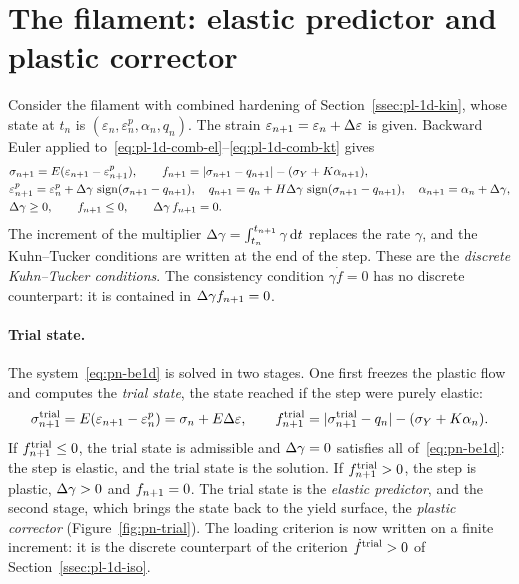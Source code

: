 \section{The filament: elastic predictor and plastic corrector}\label{sec:pn-1d}
%
Consider the filament with combined hardening of Section~\ref{ssec:pl-1d-kin},
whose state at $t_n$ is $(\varepsilon_n,\varepsilon^p_n,\alpha_n,q_n)$. The
strain $\varepsilon_{n+1}=\varepsilon_n+\Delta\varepsilon$ is given. Backward
Euler applied to~\eqref{eq:pl-1d-comb-el}--\eqref{eq:pl-1d-comb-kt} gives
\begin{equation}\label{eq:pn-be1d}
\begin{aligned}
  &\sigma_{n+1}=E(\varepsilon_{n+1}-\varepsilon^p_{n+1}),\qquad
  f_{n+1}=|\sigma_{n+1}-q_{n+1}|-(\sigma_{Y}+K\alpha_{n+1}),\\
  &\varepsilon^p_{n+1}=\varepsilon^p_n+\Delta\gamma\,\operatorname{sign}(\sigma_{n+1}-q_{n+1}),\quad
  q_{n+1}=q_n+H\Delta\gamma\,\operatorname{sign}(\sigma_{n+1}-q_{n+1}),\quad
  \alpha_{n+1}=\alpha_n+\Delta\gamma,\\
  &\Delta\gamma\ge0,\qquad f_{n+1}\le0,\qquad \Delta\gamma\,f_{n+1}=0 .
\end{aligned}
\end{equation}
The increment of the multiplier $\Delta\gamma=\int_{t_n}^{t_{n+1}}\gamma\,\mathrm{d} t$ replaces
the rate $\gamma$, and the Kuhn--Tucker conditions are written at the end of
the step. These are the \emph{discrete Kuhn--Tucker conditions}. The
consistency condition $\gamma\dot f=0$ has no discrete counterpart: it is
contained in $\Delta\gamma f_{n+1}=0$.

\paragraph{Trial state.}
%
The system~\eqref{eq:pn-be1d} is solved in two stages. One first freezes the
plastic flow and computes the \emph{trial state}, the state reached if the
step were purely elastic:
\begin{equation}\label{eq:pn-trial1d}
  \sigma^{\mathrm{trial}}_{n+1}=E(\varepsilon_{n+1}-\varepsilon^p_n)=\sigma_n+E\Delta\varepsilon,
  \qquad
  f^{\mathrm{trial}}_{n+1}=|\sigma^{\mathrm{trial}}_{n+1}-q_n|-(\sigma_{Y}+K\alpha_n).
\end{equation}
If $f^{\mathrm{trial}}_{n+1}\le0$, the trial state is admissible and $\Delta\gamma=0$ satisfies
all of~\eqref{eq:pn-be1d}: the step is elastic, and the trial state is the
solution. If $f^{\mathrm{trial}}_{n+1}>0$, the step is plastic, $\Delta\gamma>0$ and $f_{n+1}=0$.
The trial state is the \emph{elastic predictor}, and the second stage, which
brings the state back to the yield surface, the \emph{plastic corrector}
(Figure~\ref{fig:pn-trial}). The loading criterion is now written on a finite
increment: it is the discrete counterpart of the criterion $\dot f^{\mathrm{trial}}>0$ of
Section~\ref{ssec:pl-1d-iso}.

